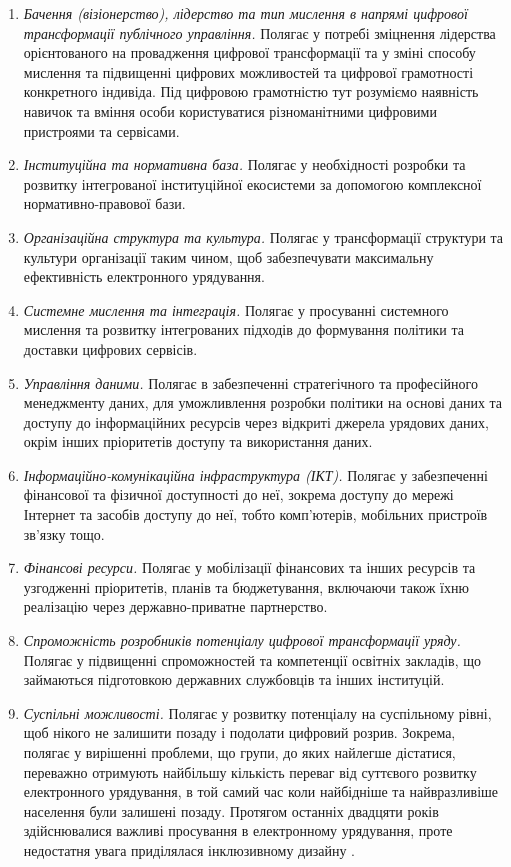 \begin{enumerate}
    \item \textit{Бачення (візіонерство), лідерство та тип мислення в напрямі цифрової трансформації публічного управління.} Полягає у потребі зміцнення лідерства орієнтованого на провадження цифрової трансформації та у зміні способу мислення та підвищенні цифрових можливостей та цифрової грамотності конкретного індивіда. Під цифровою грамотністю тут розуміємо наявність навичок та вміння особи користуватися різноманітними цифровими пристроями та сервісами.
    \item \textit{Інституційна та нормативна база.} Полягає у необхідності розробки та розвитку інтегрованої інституційної екосистеми за допомогою комплексної нормативно-правової бази.
    \item \textit{Організаційна структура та культура.} Полягає у трансформації структури та культури організації таким чином, щоб забезпечувати максимальну ефективність електронного урядування.
    \item \textit{Системне мислення та інтеграція.} Полягає у просуванні системного мислення та розвитку інтегрованих підходів до формування політики та доставки цифрових сервісів.
    \item \textit{Управління даними.} Полягає в забезпеченні стратегічного та професійного менеджменту даних, для уможливлення розробки політики на основі даних та доступу до інформаційних ресурсів через відкриті джерела урядових даних, окрім інших пріоритетів доступу та використання даних.
    \item \textit{Інформаційно-комунікаційна інфраструктура (ІКТ).} Полягає у забезпеченні фінансової та фізичної доступності до неї, зокрема доступу до мережі Інтернет та засобів доступу до неї, тобто комп'ютерів, мобільних пристроїв зв'язку тощо.
    \item \textit{Фінансові ресурси.} Полягає у мобілізації фінансових та інших ресурсів та узгодженні пріоритетів, планів та бюджетування, включаючи також їхню реалізацію через державно-приватне партнерство.
    \item \textit{Спроможність розробників потенціалу цифрової трансформації уряду.} Полягає у підвищенні спроможностей та компетенції освітніх закладів, що займаються підготовкою державних службовців та інших інституцій.
    \item \textit{Суспільні можливості.} Полягає у розвитку потенціалу на суспільному рівні, щоб нікого не залишити позаду і подолати цифровий розрив. Зокрема, полягає у вирішенні проблеми, що групи, до яких найлегше дістатися, переважно отримують найбільшу кількість переваг від суттєвого розвитку електронного урядування, в той самий час коли найбідніше та найвразливіше населення були залишені позаду. Протягом останніх двадцяти років здійснювалися важливі просування в електронному урядування, проте недостатня увага приділялася інклюзивному дизайну \cite[28]{book:un_e_govt_survey_2022}.
\end{enumerate}

